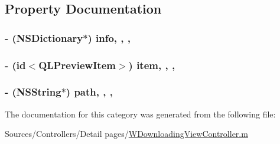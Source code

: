 \subsection{Property Documentation}
\hypertarget{category_w_downloading_view_controller_07_08_a26fdaf83a5eb92aaaab2d0c742ea4ce2}{
\subsubsection[{info}]{\setlength{\rightskip}{0pt plus 5cm}-\/ (N\-S\-Dictionary$\ast$) info\hspace{0.3cm}{\ttfamily [read]}, {\ttfamily [write]}, {\ttfamily [nonatomic]}, {\ttfamily [retain]}}}\label{category_w_downloading_view_controller_07_08_a26fdaf83a5eb92aaaab2d0c742ea4ce2}
\hypertarget{category_w_downloading_view_controller_07_08_a4774edbb2b24bef307f42c7a6a1fac2a}{
\subsubsection[{item}]{\setlength{\rightskip}{0pt plus 5cm}-\/ (id$<$Q\-L\-Preview\-Item$>$) item\hspace{0.3cm}{\ttfamily [read]}, {\ttfamily [write]}, {\ttfamily [nonatomic]}, {\ttfamily [retain]}}}\label{category_w_downloading_view_controller_07_08_a4774edbb2b24bef307f42c7a6a1fac2a}
\hypertarget{category_w_downloading_view_controller_07_08_a7eb39305dddb862399ada719b2edef18}{
\subsubsection[{path}]{\setlength{\rightskip}{0pt plus 5cm}-\/ (N\-S\-String$\ast$) path\hspace{0.3cm}{\ttfamily [read]}, {\ttfamily [write]}, {\ttfamily [nonatomic]}, {\ttfamily [retain]}}}\label{category_w_downloading_view_controller_07_08_a7eb39305dddb862399ada719b2edef18}


The documentation for this category was generated from the following file\-:\begin{DoxyCompactItemize}
\item 
Sources/\-Controllers/\-Detail pages/\hyperlink{_w_downloading_view_controller_8m}{W\-Downloading\-View\-Controller.\-m}\end{DoxyCompactItemize}
